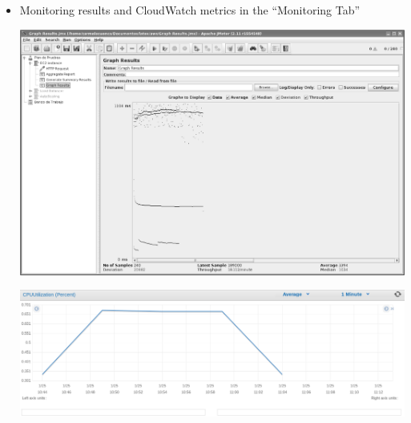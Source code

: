 \documentclass{beamer}
\begin{document}
{\begin{frame}
\begin{itemize}
\begin{enumerate}
\end{enumerate}

\item Monitoring results and CloudWatch metrics in the ``Monitoring Tab''
\begin{center}
\includegraphics[scale=0.15]{plandeprueba2.eps}
\end{center}
\begin{center}
\includegraphics[scale=0.15]{cpuutilization.png}
\end{center}
\end{itemize}

\end{frame}
}
\end{document}
